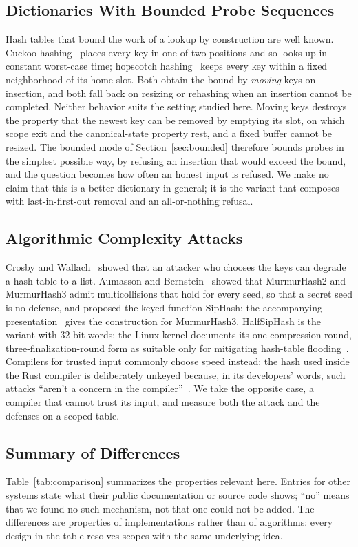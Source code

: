 \subsection{Dictionaries With Bounded Probe Sequences}
Hash tables that bound the work of a lookup by construction are well known. Cuckoo hashing~\cite{pagh2004} places every key in one of two positions and so looks up in constant worst-case time; hopscotch hashing~\cite{herlihy2008} keeps every key within a fixed neighborhood of its home slot. Both obtain the bound by \emph{moving} keys on insertion, and both fall back on resizing or rehashing when an insertion cannot be completed. Neither behavior suits the setting studied here. Moving keys destroys the property that the newest key can be removed by emptying its slot, on which scope exit and the canonical-state property rest, and a fixed buffer cannot be resized. The bounded mode of Section~\ref{sec:bounded} therefore bounds probes in the simplest possible way, by refusing an insertion that would exceed the bound, and the question becomes how often an honest input is refused. We make no claim that this is a better dictionary in general; it is the variant that composes with last-in-first-out removal and an all-or-nothing refusal.

\subsection{Algorithmic Complexity Attacks}
Crosby and Wallach~\cite{crosby2003} showed that an attacker who chooses the keys can degrade a hash table to a list. Aumasson and Bernstein~\cite{aumasson2012} showed that MurmurHash2 and MurmurHash3 admit multicollisions that hold for every seed, so that a secret seed is no defense, and proposed the keyed function SipHash; the accompanying presentation~\cite{aumassonslides} gives the construction for MurmurHash3. HalfSipHash is the variant with 32-bit words; the Linux kernel documents its one-compression-round, three-finalization-round form as suitable only for mitigating hash-table flooding~\cite{linuxsiphash}. Compilers for trusted input commonly choose speed instead: the hash used inside the Rust compiler is deliberately unkeyed because, in its developers' words, such attacks ``aren't a concern in the compiler''~\cite{rustchash}. We take the opposite case, a compiler that cannot trust its input, and measure both the attack and the defenses on a scoped table.

\subsection{Summary of Differences}
Table~\ref{tab:comparison} summarizes the properties relevant here. Entries for other systems state what their public documentation or source code shows; ``no'' means that we found no such mechanism, not that one could not be added. The differences are properties of implementations rather than of algorithms: every design in the table resolves scopes with the same underlying idea.

